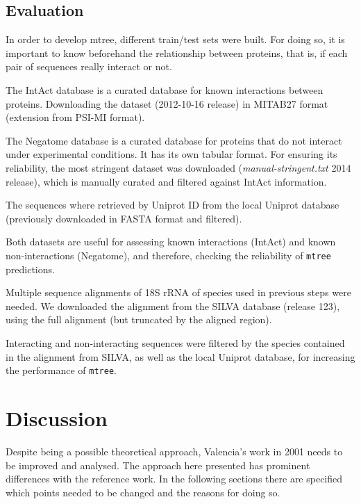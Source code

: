 \documentclass[11pt]{article}
\begin{document}
\subsection{Evaluation}

In order to develop mtree, different train/test sets were built. For doing so, it is important to know beforehand the relationship between proteins, that is, if each pair of sequences really interact or not.

The IntAct database\cite{intact} is a curated database for known interactions between proteins. Downloading the dataset (2012-10-16 release) in MITAB27 format (extension from PSI-MI format).

The Negatome database\cite{negatome} is a curated database for proteins that do not interact under experimental conditions. It has its own tabular format. For ensuring its reliability, the most stringent dataset was downloaded (\textit{manual-stringent.txt} 2014 release), which is manually curated and filtered against IntAct information.

The sequences where retrieved by Uniprot ID from the local Uniprot database (previously downloaded in FASTA format and filtered). 

Both datasets are useful for assessing known interactions (IntAct) and known non-interactions (Negatome), and therefore, checking the reliability of \texttt{mtree} predictions.

Multiple sequence alignments of 18S rRNA of species used in previous steps were needed. We downloaded the alignment from the SILVA database\cite{SILVA} (release 123), using the full alignment (but truncated by the aligned region).

Interacting and non-interacting sequences were filtered by the species contained in the alignment from SILVA, as well as the local Uniprot database, for increasing the performance of \texttt{mtree}.



\section{Discussion}
Despite being a possible theoretical approach, Valencia's work in 2001\cite{Pazos2001} needs to be improved and analysed. The approach here presented has prominent differences with the reference work. In the following sections there are specified which points needed to be changed and the reasons for doing so.
\end{document}

